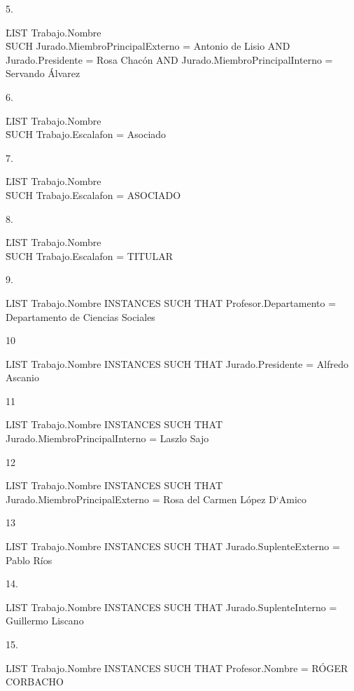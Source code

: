 5.

\begin{tabbing}	
\= LIST Trabajo.Nombre \\
\= SUCH Jurado.MiembroPrincipalExterno = Antonio de Lisio AND
Jurado.Presidente = Rosa Chacón AND
Jurado.MiembroPrincipalInterno = Servando Álvarez
\end{tabbing}

6.

\begin{tabbing}	
\= LIST Trabajo.Nombre \\
\= SUCH Trabajo.Escalafon = Asociado \\
\end{tabbing}

7.

\begin{tabbing}	
\= LIST Trabajo.Nombre \\
\= SUCH Trabajo.Escalafon = ASOCIADO \\
\end{tabbing}

8.

\begin{tabbing}	
\= LIST Trabajo.Nombre \\
\= SUCH Trabajo.Escalafon = TITULAR \\
\end{tabbing}

9.

LIST Trabajo.Nombre INSTANCES SUCH THAT 
Profesor.Departamento = Departamento de Ciencias Sociales

10

LIST Trabajo.Nombre INSTANCES SUCH THAT 
Jurado.Presidente = Alfredo Ascanio

11

LIST Trabajo.Nombre INSTANCES SUCH THAT 
Jurado.MiembroPrincipalInterno = Laszlo Sajo

12

LIST Trabajo.Nombre INSTANCES SUCH THAT 
Jurado.MiembroPrincipalExterno = Rosa del Carmen López D`Amico

13

LIST Trabajo.Nombre INSTANCES SUCH THAT 
Jurado.SuplenteExterno = Pablo Ríos

14.

LIST Trabajo.Nombre INSTANCES SUCH THAT 
Jurado.SuplenteInterno = Guillermo Liscano

15.

LIST Trabajo.Nombre INSTANCES SUCH THAT 
Profesor.Nombre = RÓGER CORBACHO


